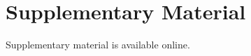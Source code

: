 \documentclass[11pt,onecolumn]{article}
\begin{document}
\section{Supplementary Material}

Supplementary material is available online. %




\end{document}
